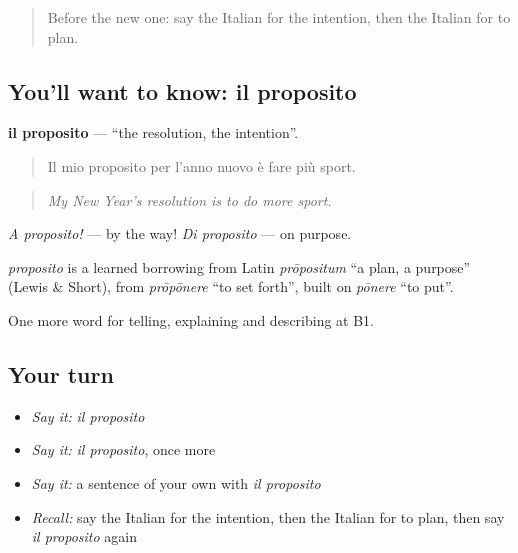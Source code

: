 \label{lesson:IT-C378-proposito}



\begin{quote}
Before the new one: say the Italian for the intention, then the Italian for to plan.
\end{quote}

\subsection*{You'll want to know: il proposito}
\textbf{il proposito} — \textquotedblleft{}the resolution, the intention\textquotedblright{}.

\begin{quote}
Il mio proposito per l'anno nuovo è fare più sport.
\end{quote}

\begin{quote}
\emph{My New Year's resolution is to do more sport.}
\end{quote}

\emph{A proposito!} — by the way! \emph{Di proposito} — on purpose.

\begin{cousinweb}
\emph{proposito} is a learned borrowing from Latin \emph{prōpositum} \textquotedblleft{}a plan, a purpose\textquotedblright{} (Lewis \& Short), from \emph{prōpōnere} \textquotedblleft{}to set forth\textquotedblright{}, built on \emph{pōnere} \textquotedblleft{}to put\textquotedblright{}.
\end{cousinweb}

\begin{grammarlens}[title={What you've built}]
One more word for telling, explaining and describing at B1.
\end{grammarlens}

\subsection*{Your turn}
\begin{itemize}
\raggedright
  \item \emph{Say it:} \emph{il proposito}
  \item \emph{Say it:} \emph{il proposito}, once more
  \item \emph{Say it:} a sentence of your own with \emph{il proposito}
  \item \emph{Recall:} say the Italian for the intention, then the Italian for to plan, then say \emph{il proposito} again
\end{itemize}

